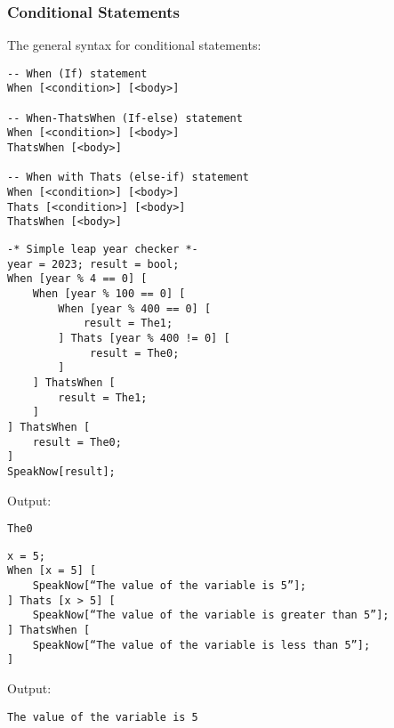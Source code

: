\subsubsection{Conditional Statements}

The general syntax for conditional statements:
\begin{verbatim}
-- When (If) statement
When [<condition>] [<body>]

-- When-ThatsWhen (If-else) statement
When [<condition>] [<body>]
ThatsWhen [<body>]

-- When with Thats (else-if) statement
When [<condition>] [<body>]
Thats [<condition>] [<body>]
ThatsWhen [<body>]
\end{verbatim}
\begin{verbatim}
-* Simple leap year checker *-
year = 2023; result = bool;
When [year % 4 == 0] [
    When [year % 100 == 0] [
        When [year % 400 == 0] [
            result = The1;
        ] Thats [year % 400 != 0] [
             result = The0;
        ]
    ] ThatsWhen [
        result = The1;
    ]
] ThatsWhen [
    result = The0;
]
SpeakNow[result];
\end{verbatim}
Output:
\begin{verbatim}
The0
\end{verbatim}
\begin{verbatim}
x = 5;
When [x = 5] [
    SpeakNow[“The value of the variable is 5”];
] Thats [x > 5] [
    SpeakNow[“The value of the variable is greater than 5”];
] ThatsWhen [
    SpeakNow[“The value of the variable is less than 5”];
]
\end{verbatim}
Output:
\begin{verbatim}
The value of the variable is 5
\end{verbatim}